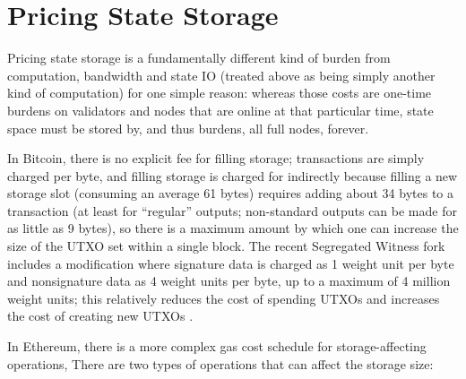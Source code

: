\documentclass[12pt, final]{article}
\begin{document}
\section{Pricing State Storage}
\label{sect:storage}

Pricing state storage is a fundamentally different kind of burden from computation, bandwidth and state IO (treated above as being simply another kind of computation) for one simple reason: whereas those costs are one-time burdens on validators and nodes that are online at that particular time, state space must be stored by, and thus burdens, all full nodes, forever.

In Bitcoin, there is no explicit fee for filling storage; transactions are simply charged per byte, and filling storage is charged for indirectly because filling a new storage slot (consuming an average 61 bytes\cite{utxo1}) requires adding about 34 bytes\cite{utxo2} to a transaction (at least for ``regular'' outputs; non-standard outputs can be made for as little as 9 bytes\cite{utxo3}\cite{utxo4}), so there is a maximum amount by which one can increase the size of the UTXO set within a single block. The recent Segregated Witness fork includes a modification where signature data is charged as 1 weight unit per byte and nonsignature data as 4 weight units per byte, up to a maximum of 4 million weight units; this relatively reduces the cost of spending UTXOs and increases the cost of creating new UTXOs \cite{segwitwhy4}.

In Ethereum, there is a more complex gas cost schedule for storage-affecting operations, There are two types of operations that can affect the storage size:
\end{document}
